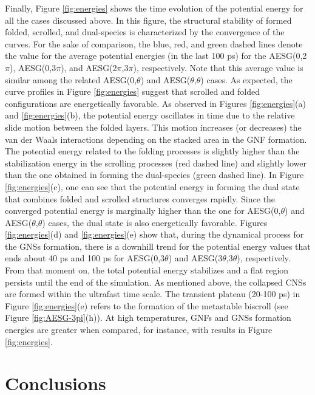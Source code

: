 \documentclass[twoside,twocolumn,9pt]{article}
\begin{document}
Finally, Figure \ref{fig:energies} shows the time evolution of the potential energy for all the cases discussed above. In this figure, the structural stability of formed folded, scrolled, and dual-species is characterized by the convergence of the curves. For the sake of comparison, the blue, red, and green dashed lines denote the value for the average potential energies (in the last 100 ps) for the AESG(0,2$\pi$), AESG(0,3$\pi$), and  AESG(2$\pi$,3$\pi$), respectively. Note that this average value is similar among the related AESG(0,$\theta$) and AESG($\theta$,$\theta$) cases. As expected, the curve profiles in Figure \ref{fig:energies} suggest that scrolled and folded configurations are energetically favorable. As observed in Figures \ref{fig:energies}(a) and \ref{fig:energies}(b), the potential energy oscillates in time due to the relative slide motion between the folded layers. This motion increases (or decreases) the van der Waals interactions depending on the stacked area in the GNF formation. The potential energy related to the folding processes is slightly higher than the stabilization energy in the scrolling processes (red dashed line) and slightly lower than the one obtained in forming the dual-species (green dashed line). In Figure \ref{fig:energies}(c), one can see that the potential energy in forming the dual state that combines folded and scrolled structures converges rapidly. Since the converged potential energy is marginally higher than the one for AESG(0,$\theta$) and AESG($\theta$,$\theta$) cases, the dual state is also energetically favorable. Figures \ref{fig:energies}(d) and \ref{fig:energies}(e) show that, during the dynamical process for the GNSs formation, there is a downhill trend for the potential energy values that ends about 40 ps and 100 ps for AESG(0,3$\theta$) and AESG(3$\theta$,3$\theta$), respectively. From that moment on, the total potential energy stabilizes and a flat region persists until the end of the simulation. As mentioned above, the collapsed CNSs are formed within the ultrafast time scale. The transient plateau (20-100 ps) in Figure \ref{fig:energies}(e) refers to the formation of the metastable biscroll (see Figure \ref{fig:AESG-3pi}(h)). At high temperatures, GNFs and GNSs formation energies are greater when compared, for instance, with results in Figure \ref{fig:energies}. 

\section{Conclusions}
\end{document}
